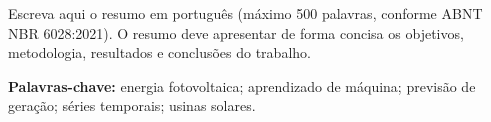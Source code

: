 Escreva aqui o resumo em português (máximo 500 palavras, conforme ABNT NBR 6028:2021).
O resumo deve apresentar de forma concisa os objetivos, metodologia, resultados e
conclusões do trabalho.

\vspace{1cm}
\noindent\textbf{Palavras-chave:} energia fotovoltaica; aprendizado de máquina;
previsão de geração; séries temporais; usinas solares.
